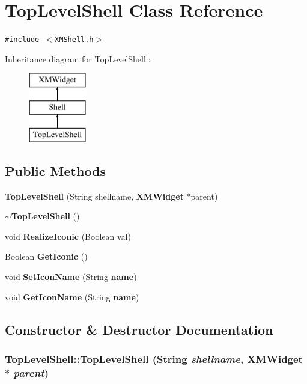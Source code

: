 \section{Top\-Level\-Shell  Class Reference}
\label{classTopLevelShell}
{\tt \#include $<$XMShell.h$>$}

Inheritance diagram for Top\-Level\-Shell::\begin{figure}[H]
\begin{center}
\leavevmode
\includegraphics[height=3cm]{classTopLevelShell}
\end{center}
\end{figure}
\subsection*{Public Methods}
\begin{CompactItemize}
\item 
{\bf Top\-Level\-Shell} (String shellname, {\bf XMWidget} $\ast$parent)
\item 
{\bf $\sim$Top\-Level\-Shell} ()
\item 
void {\bf Realize\-Iconic} (Boolean val)
\item 
Boolean {\bf Get\-Iconic} ()
\item 
void {\bf Set\-Icon\-Name} (String {\bf name})
\item 
void {\bf Get\-Icon\-Name} (String {\bf name})
\end{CompactItemize}


\subsection{Constructor \& Destructor Documentation}
\subsubsection{\setlength{\rightskip}{0pt plus 5cm}Top\-Level\-Shell::Top\-Level\-Shell (String {\em shellname}, {\bf XMWidget} $\ast$ {\em parent})}\label{classTopLevelShell_a0}




